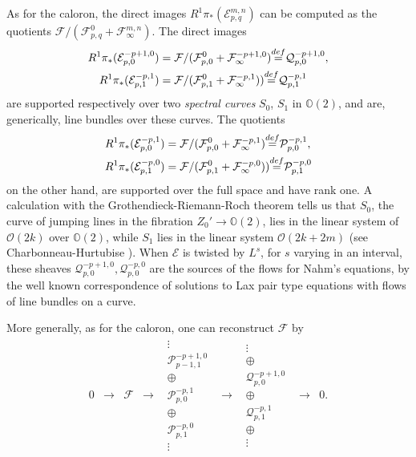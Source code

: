 \documentclass[12pt]{article}
\theoremstyle{definition}
\theoremstyle{remark}
\numberwithin{theorem}{section}
\def\bO{{\mathbb {O}}}
\def\pE{{\mathcal E}}
\def\pF{{\mathcal F}}
\def\pO{{\mathcal O}}
\def\pP{{\mathcal P}}
\def\pQ{{\mathcal Q}}
\begin{document}
As for the caloron, the direct images $R^1\pi_*(\pE_{p,q}^{m,n})$ can be computed as the quotients $\pF/(\pF^0_{p,q}+\pF_\infty^{m,n})$. The direct images  
\begin{align}R^1\pi_*(\pE_{p,0}^{-p+1,0})&=\pF/(\pF^0_{p,0}+\pF_\infty^{-p+1,0}){\buildrel{def}\over {=}}\pQ_{p,0}^{-p+1,0} , \\R^1\pi_*(\pE_{p,1}^{-p,1}) &= \pF/(\pF^0_{p,1}+\pF_\infty^{-p,1})){\buildrel{def}\over {=}}\pQ_{p,1}^{-p,1}
\end{align}
are supported respectively over two {\it spectral curves}  $S_0$, $S_1$ in $\bO(2)$, and are, generically, line bundles over these curves. The quotients  
\begin{align}R^1\pi_*(\pE_{p,0}^{-p ,1})&=\pF/(\pF^0_{p,0}+\pF_\infty^{-p,1}){\buildrel{def}\over {=}}\pP_{p,0}^{-p,1} , \\R^1\pi_*(\pE_{p,1}^{-p,0}) &= \pF/(\pF^0_{p,1}+\pF_\infty^{-p,0})){\buildrel{def}\over {=}}\pP_{p,1}^{-p,0}
\end{align}
on the other hand, are supported over the full space and have rank one. A calculation with the Grothendieck-Riemann-Roch theorem tells us that $S_0$, the curve of jumping lines in the fibration $Z_0'\rightarrow \bO(2)$, lies in the linear system of $\pO(2k)$ over $\bO(2)$, while $S_1$ lies in the linear system $\pO(2k+ 2m)$ (see Charbonneau-Hurtubise \cite{Charbonneau:2006gu}). When $\pE$ is  twisted by $L^s$, for $s$ varying in an interval, these sheaves $\pQ_{p,0}^{ -p+1,0},\pQ_{p,0}^{ -p,0}$ are the sources of the flows for Nahm's equations, by the well known correspondence of solutions to Lax pair type equations with flows of line bundles on a curve.

More generally, as for the caloron, one can reconstruct $\pF$ by 
\begin{equation}\label{description-of-F-2}
 \begin{matrix}
0&\rightarrow&\pF&\rightarrow&
\begin{matrix}\vdots\\ \pP_{p-1,1}^{-p+1,0}   \\ \oplus\\
\pP_{p,0}^{-p,1} \\ \oplus\\ \pP_{p,1}^{-p,0}  \\ \vdots
\end{matrix}
&\rightarrow &
\begin{matrix}
\vdots\\ \oplus\\ \pQ_{p,0}^{-p+1,0} \\
\oplus\\ \pQ_{p,1}^{-p,1} \\ \oplus\\ \vdots
\end{matrix}
&\rightarrow &0.
\end{matrix}
\end{equation}
  
\end{document}
